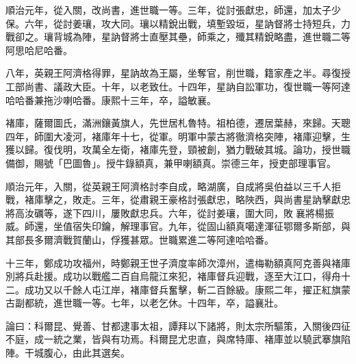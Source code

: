 \begin{pinyinscope}
順治元年，從入關，改尚書，進世職一等。三年，從討張獻忠，師還，加太子少保。六年，從討姜瓖，攻大同。瓖以精銳出戰，填塹毀垣，星訥督將士持短兵，力戰卻之。瓖背城為陣，星訥督將士直壓其壘，師乘之，殲其精銳略盡，進世職二等阿思哈尼哈番。

八年，英親王阿濟格得罪，星訥故為王屬，坐奪官，削世職，籍家產之半。尋復授工部尚書、議政大臣。十年，以老致仕。十四年，星訥自訟軍功，復世職一等阿達哈哈番兼拖沙喇哈番。康熙十三年，卒，謚敏襄。

褚庫，薩爾圖氏，滿洲鑲黃旗人，先世居札魯特。祖柏德，遷居葉赫，來歸。天聰四年，師圍大凌河，褚庫年十七，從軍。明軍中蒙古將徹濟格突陣，褚庫迎擊，生獲以歸。復伐明，攻萬全左衛，褚庫先登，頸被創，猶力戰破其城。論功，授世職備御，賜號「巴圖魯」。授牛錄額真，兼甲喇額真。崇德三年，授吏部理事官。

順治元年，入關，從英親王阿濟格討李自成，略湖廣，自成將吳伯益以三千人拒戰，褚庫擊之，敗走。三年，從肅親王豪格討張獻忠，略陜西，與尚書星訥擊獻忠將高汝礪等，遂下四川，屢敗獻忠兵。六年，從討姜瓖，圍大同，敗襄將楊振威。師還，坐值宿失印鑰，解理事官。九年，從固山額真噶達渾征鄂爾多斯部，與其部長多爾濟戰賀蘭山，俘獲甚眾。世職累進二等阿達哈哈番。

十三年，鄭成功攻福州，時鄭親王世子濟度率師次漳州，遣梅勒額真阿克善與褚庫別將兵赴援。成功以戰艦二百自烏龍江來犯，褚庫督兵迎戰，逐至大江口，得舟十二。成功又以千餘人屯江岸，褚庫督兵奮擊，斬二百餘級。康熙二年，擢正紅旗蒙古副都統，進世職一等。七年，以老乞休。十四年，卒，謚襄壯。

論曰：科爾昆、覺善、甘都逮事太祖，譚拜以下諸將，則太宗所驅策，入關後四征不庭，成一統之業，皆與有功焉。科爾昆尤忠直，與席特庫、褚庫並以驍武搴旗陷陣。干城腹心，由此其選矣。


\end{pinyinscope}